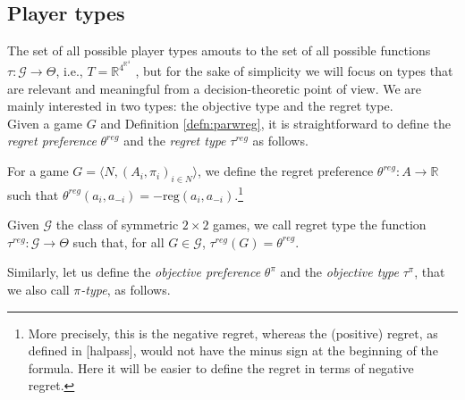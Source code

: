 \documentclass[fleqn,reqno,11pt]{article}
\begin{document}
\subsection{Player types}

The set of all possible player types amouts to the set of all possible functions $ \tau: \mathcal{G} \rightarrow  \Theta $, i.e., $T=\mathbb{R}^{4^{\mathbb{R}^{4}}} $ , but for the sake of simplicity we will focus on types that are relevant and meaningful from a decision-theoretic point of view. We are mainly interested in two types: the objective type and the regret type.\\
Given a game $G$ and Definition \ref{defn:parwreg}, it is straightforward to define the
\textit{regret preference} $\theta^{reg}$ and the \textit{regret type} $\tau^{reg}$ as
follows. 


\begin{definition} \label{defn:regpref}

For a game $ G=\langle N, (A_i , \pi_i)_{i \in N} \rangle $, we define the regret preference $ \theta^{reg}: A \rightarrow \mathbb{R} $ such that $ \theta^{reg}(a_i,a_{-i})=-\text{reg}(a_i,a_{-i}) $.\footnote{More precisely, this is the negative regret, whereas the (positive) regret, as defined in [halpass], would not have the minus sign at the beginning of the formula. Here it will be easier to define the regret in terms of negative regret.}

\end{definition}



\begin{definition} \label{defn:regtype}

Given $ \mathcal{G} $ the class of symmetric $ 2 \times 2 $ games, we call regret type the function $\tau^{reg}: \mathcal{G} \rightarrow  \Theta$ such that, for all $G \in \mathcal{G}$, $ \tau^{reg}(G)= \theta^{reg}$.

\end{definition}

\noindent Similarly, let us define the \textit{objective preference} $\theta^{\pi}$ and the \textit{objective type} $ \tau^{\pi} $, that we also call $\pi$\textit{-type}, as follows. 
\end{document}
